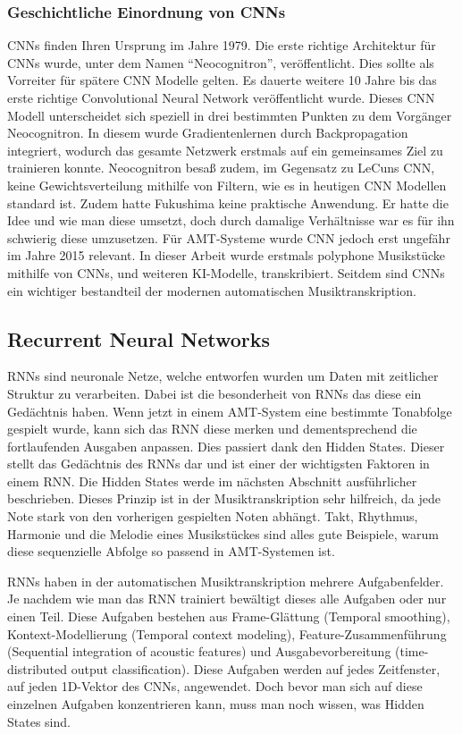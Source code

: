 \subsubsection{Geschichtliche Einordnung von CNNs}
CNNs finden Ihren Ursprung im Jahre 1979.
Die erste richtige Architektur für CNNs wurde, unter dem Namen \enquote{Neocognitron}, veröffentlicht\cite{fukushima1980neocognitron}.
Dies sollte als Vorreiter für spätere CNN Modelle gelten.
Es dauerte weitere 10 Jahre bis das erste richtige Convolutional Neural Network veröffentlicht wurde\cite{lecun1989backpropagation}.
Dieses CNN Modell unterscheidet sich speziell in drei bestimmten Punkten zu dem Vorgänger Neocognitron.
In diesem wurde Gradientenlernen durch Backpropagation integriert,
wodurch das gesamte Netzwerk erstmals auf ein gemeinsames Ziel zu trainieren konnte.
Neocognitron besaß zudem, im Gegensatz zu LeCuns CNN,
keine Gewichtsverteilung mithilfe von Filtern, wie es in heutigen CNN Modellen standard ist.
Zudem hatte Fukushima keine praktische Anwendung.
Er hatte die Idee und wie man diese umsetzt, doch durch damalige Verhältnisse war es für ihn schwierig diese umzusetzen.
Für AMT-Systeme wurde CNN jedoch erst ungefähr im Jahre 2015 relevant\cite{sigtia2016end}.
In dieser Arbeit wurde erstmals polyphone Musikstücke mithilfe von CNNs, und weiteren KI-Modelle, transkribiert.
Seitdem sind CNNs ein wichtiger bestandteil der modernen automatischen Musiktranskription.

\subsection{Recurrent Neural Networks}
RNNs sind neuronale Netze, welche entworfen wurden um Daten mit zeitlicher Struktur zu verarbeiten.
Dabei ist die besonderheit von RNNs das diese ein Gedächtnis haben.
Wenn jetzt in einem AMT-System eine bestimmte Tonabfolge gespielt wurde,
kann sich das RNN diese merken und dementsprechend die fortlaufenden Ausgaben anpassen.
Dies passiert dank den Hidden States.
Dieser stellt das Gedächtnis des RNNs dar und ist einer der wichtigsten Faktoren in einem RNN\@.
Die Hidden States werde im nächsten Abschnitt ausführlicher beschrieben.
Dieses Prinzip ist in der Musiktranskription sehr hilfreich,
da jede Note stark von den vorherigen gespielten Noten abhängt.
Takt, Rhythmus, Harmonie und die Melodie eines Musikstückes sind alles gute Beispiele,
warum diese sequenzielle Abfolge so passend in AMT-Systemen ist.

RNNs haben in der automatischen Musiktranskription mehrere Aufgabenfelder.
Je nachdem wie man das RNN trainiert bewältigt dieses alle Aufgaben oder nur einen Teil.
Diese Aufgaben bestehen aus Frame-Glättung (Temporal smoothing), Kontext-Modellierung (Temporal context modeling),
Feature-Zusammenführung (Sequential integration of acoustic features)
und Ausgabevorbereitung (time-distributed output classification).
Diese Aufgaben werden auf jedes Zeitfenster, auf jeden 1D-Vektor des CNNs, angewendet.
Doch bevor man sich auf diese einzelnen Aufgaben konzentrieren kann, muss man noch wissen, was Hidden States sind.

